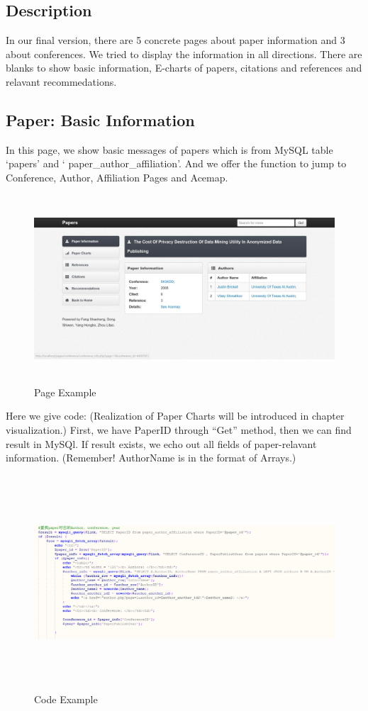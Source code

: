 \documentclass{book}
\begin{document}
\subsection{Description}
In our final version, there are 5 concrete pages about paper information and 3 about conferences. We tried to display the information in all directions. There are blanks to show basic information, E-charts of papers, citations and references and relavant recommedations. 

\subsection{Paper: Basic Information}
In this page, we show basic messages of papers
which is from MySQL table `papers' and ` paper\_author\_affiliation'.
 And we offer the function to jump to Conference, Author, Affiliation Pages and Acemap.
\begin{figure}[H]
\centering
\includegraphics[height=7.0cm,width=16.0cm]{img/yhb_paper_1.jpg}
\caption{Page Example}
\end{figure}


Here we give code:
(Realization of Paper Charts will be introduced in chapter visualization.)
First, we have PaperID through ``Get'' method, then we can find result in MySQl. If result exists, we echo out all fields of paper-relavant  information. (Remember!  AuthorName is in the format of Arrays.)
\begin{figure}[H]
\centering
\includegraphics[height=8.0cm,width=16.0cm]{img/yhb_mp_1.png}
\caption{Code Example}
\end{figure}
\end{document}
